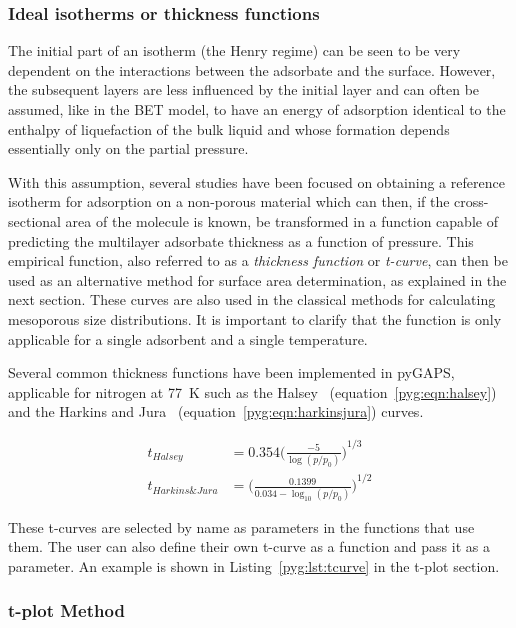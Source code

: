 \subsubsection{Ideal isotherms or thickness functions}\label{pyg:charac:tcurve}

The initial part of an isotherm (the Henry regime) can be seen to 
be very dependent on the interactions between the adsorbate and the
surface. However, the subsequent layers are less influenced by the
initial layer and can often be assumed, like in the BET model, 
to have an energy of adsorption identical to the enthalpy of liquefaction
of the bulk liquid and whose formation depends essentially only on 
the partial pressure.

With this assumption, several studies have been focused on obtaining
a reference isotherm for adsorption on a non-porous material which can
then, if the cross-sectional area of the molecule is known, be transformed
in a function capable of predicting the multilayer adsorbate thickness
as a function of pressure. This empirical function, also referred to as a
\textit{thickness function} or \textit{t-curve}, can then be used as an 
alternative method for surface area determination, as explained in 
the next section. These curves are also used in the classical methods 
for calculating mesoporous size distributions. It is important to 
clarify that the function is only applicable for a single adsorbent
and a single temperature. 

Several common thickness functions have been implemented in pyGAPS,
applicable for nitrogen at \SI{77}{\kelvin}
such as the Halsey~\cite{halseyPhysicalAdsorptionNon1948} 
(equation~\ref{pyg:eqn:halsey}) and the
Harkins and Jura~\cite{harkinsSurfacesSolidsXIII1944a}
(equation~\ref{pyg:eqn:harkinsjura}) curves.

\begin{align}
	t_{Halsey} &= 0.354 {\Big(\frac{-5}{\log(p/p_0)}\Big)}^{1/3} \label{pyg:eqn:halsey} \\
	t_{Harkins\&Jura} &= {\Big(\frac{0.1399}{0.034 - \log_{10}(p/p_0)}\Big)}^{1/2} \label{pyg:eqn:harkinsjura}
\end{align}

These t-curves are selected by name as parameters in 
the functions that use them. The user can also define their 
own t-curve as a function and pass it as a parameter. An example
is shown in Listing~\ref{pyg:lst:tcurve} in the t-plot section.

\subsubsection{t-plot Method}\label{pyg:charac:tplot}

